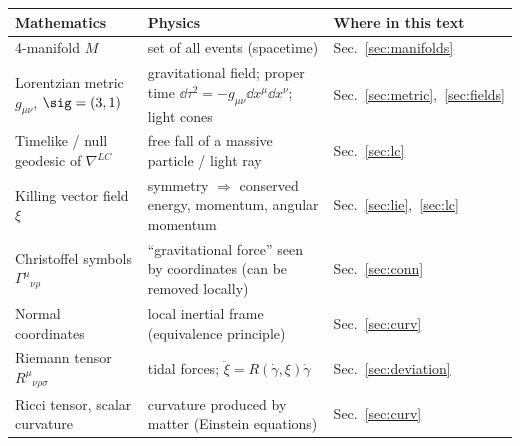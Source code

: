 
\begin{center}
\begin{tabular}{@{}p{4.1cm}p{5.1cm}p{5.2cm}@{}}
\toprule
\textbf{Mathematics} & \textbf{Physics} & \textbf{Where in this text}\\ \midrule
4-manifold $M$ & set of all events (spacetime) & Sec.~\ref{sec:manifolds}\\
Lorentzian metric $g_{\mu\nu}$, $\sig=(3,1)$ & gravitational field; proper time $\dd\tau^2=-g_{\mu\nu}\dd x^\mu\dd x^\nu$; light cones & Sec.~\ref{sec:metric},~\ref{sec:fields}\\
Timelike / null geodesic of $\nabla^{LC}$ & free fall of a massive particle / light ray & Sec.~\ref{sec:lc}\\
Killing vector field $\xi$ & symmetry $\Rightarrow$ conserved energy, momentum, angular momentum & Sec.~\ref{sec:lie},~\ref{sec:lc}\\
Christoffel symbols $\Gamma^\mu{}_{\nu\rho}$ & ``gravitational force'' seen by coordinates (can be removed locally) & Sec.~\ref{sec:conn}\\
Normal coordinates & local inertial frame (equivalence principle) & Sec.~\ref{sec:curv}\\
Riemann tensor $R^\mu{}_{\nu\rho\sigma}$ & tidal forces; $\ddot\xi=R(\dot\gamma,\xi)\dot\gamma$ & Sec.~\ref{sec:deviation}\\
Ricci tensor, scalar curvature & curvature produced by matter (Einstein equations) & Sec.~\ref{sec:curv}\\ \bottomrule
\end{tabular}
\end{center}

